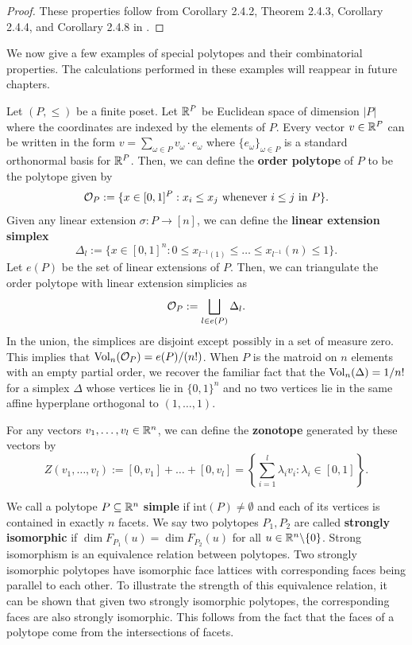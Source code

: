 \documentclass{puthesis-UG}
\begin{document}
\begin{proof}
	These properties follow from Corollary 2.4.2, Theorem 2.4.3, Corollary 2.4.4, and Corollary 2.4.8 in \cite{schneider_2013}. 
\end{proof}

We now give a few examples of special polytopes and their combinatorial properties. The calculations performed in these examples will reappear in future chapters. 

\begin{example}
	Let $(P, \leq)$ be a finite poset. Let $\mathbb{R}^P$ be Euclidean space of dimension $|P|$ where the coordinates are indexed by the elements of $P$. Every vector $v \in \mathbb{R}^P$ can be written in the form $v = \sum_{\omega \in P} v_\omega \cdot e_\omega$ where $\{e_\omega\}_{\omega \in P}$ is a standard orthonormal basis for $\mathbb{R}^P$. Then, we can define the \textbf{order polytope} of $P$ to be the polytope given by
	\[
		\mathcal{O}_P := \{x \in [0, 1]^P : x_{i} \leq x_{j} \text{ whenever } i \leq j \text{ in } P\}.
	\]
	Given any linear extension $\sigma : P \to [n]$, we can define the \textbf{linear extension simplex}
	\[
		\Delta_l := \{x \in [0, 1]^n : 0 \leq x_{l^{-1}(1)} \leq \ldots \leq x_{l^{-1}}(n) \leq 1\}.
	\]
	Let $e(P)$ be the set of linear extensions of $P$. Then, we can triangulate the order polytope with linear extension simplicies as
	\[
		\mathcal{O}_P := \bigsqcup_{l \in e(P)} \Delta_l.
	\]
	In the union, the simplices are disjoint except possibly in a set of measure zero. This implies that $\operatorname{Vol}_n(\mathcal{O}_P) = e(P) / (n!)$. When $P$ is the matroid on $n$ elements with an empty partial order, we recover the familiar fact that the $\operatorname{Vol}_n(\Delta) = 1/n!$ for a simplex $\Delta$ whose vertices lie in $\{0, 1\}^n$ and no two vertices lie in the same affine hyperplane orthogonal to $(1, \ldots, 1)$.  
\end{example}

\begin{example}[Zonotope] \label{zonotope-example}
	For any vectors $v_1, \ldots, v_l \in \mathbb{R}^n$, we can define the \textbf{zonotope} generated by these vectors by 
	\[
		Z(v_1, \ldots, v_l) := [0, v_1] + \ldots + [0, v_l] = \left \{ \sum_{i = 1}^l \lambda_i v_i : \lambda_i \in [0, 1] \right \}.
	\]
\end{example}
We call a polytope $P \subseteq \mathbb{R}^n$ \textbf{simple} if $\text{int} (P) \neq \emptyset$ and each of its vertices is contained in exactly $n$ facets. We say two polytopes $P_1, P_2$ are called \textbf{strongly isomorphic} if $\dim F_{P_1}(u) = \dim F_{P_2}(u)$ for all $u \in \mathbb{R}^n \backslash \{0\}$. Strong isomorphism is an equivalence relation between polytopes. Two strongly isomorphic polytopes have isomorphic face lattices with corresponding faces being parallel to each other. To illustrate the strength of this equivalence relation, it can be shown that given two strongly isomorphic polytopes, the corresponding faces are also strongly isomorphic. This follows from the fact that the faces of a polytope come from the intersections of facets. 
\end{document}
